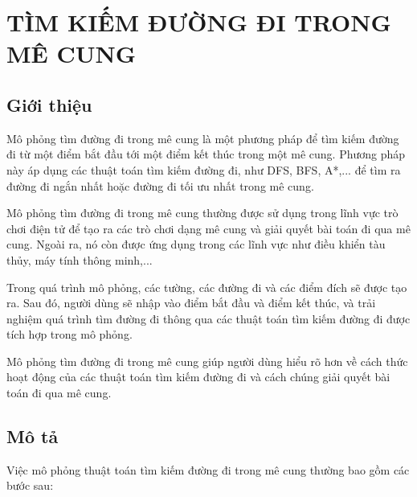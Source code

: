 
\chapter{TÌM KIẾM ĐƯỜNG ĐI TRONG MÊ CUNG} %

\label{Chapter1} %


\newcommand{\keyword}[1]{\textbf{#1}}
\newcommand{\tabhead}[1]{\textbf{#1}}
\newcommand{\code}[1]{\texttt{#1}}
\newcommand{\file}[1]{\texttt{\bfseries#1}}
\newcommand{\option}[1]{\texttt{\itshape#1}}

\section{Giới thiệu}
Mô phỏng tìm đường đi trong mê cung là một phương pháp để tìm kiếm đường đi từ một điểm bắt đầu tới một điểm kết thúc trong một mê cung. Phương pháp này áp dụng các thuật toán tìm kiếm đường đi, như DFS, BFS, A*,... để tìm ra đường đi ngắn nhất hoặc đường đi tối ưu nhất trong mê cung.

Mô phỏng tìm đường đi trong mê cung thường được sử dụng trong lĩnh vực trò chơi điện tử để tạo ra các trò chơi dạng mê cung và giải quyết bài toán đi qua mê cung. Ngoài ra, nó còn được ứng dụng trong các lĩnh vực như điều khiển tàu thủy, máy tính thông minh,...

Trong quá trình mô phỏng, các tường, các đường đi và các điểm đích sẽ được tạo ra. Sau đó, người dùng sẽ nhập vào điểm bắt đầu và điểm kết thúc, và trải nghiệm quá trình tìm đường đi thông qua các thuật toán tìm kiếm đường đi được tích hợp trong mô phỏng.

Mô phỏng tìm đường đi trong mê cung giúp người dùng hiểu rõ hơn về cách thức hoạt động của các thuật toán tìm kiếm đường đi và cách chúng giải quyết bài toán đi qua mê cung.



\section{Mô tả}
Việc mô phỏng thuật toán tìm kiếm đường đi trong mê cung thường bao gồm các bước sau:

